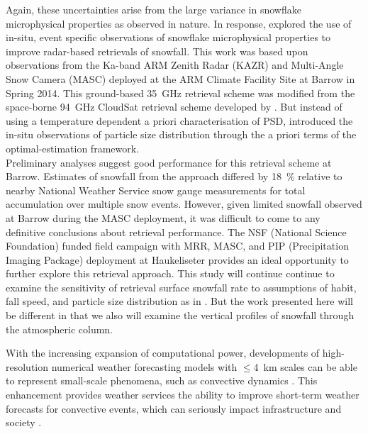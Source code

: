 Again, these uncertainties arise from the large variance in snowflake microphysical  properties as observed in nature. In response, \citet{cooper_variational_2017} explored the use of in-situ, event specific  observations of snowflake microphysical properties to improve radar-based retrievals of snowfall.  This work was based upon observations from the Ka-band ARM Zenith Radar (KAZR) and Multi-Angle Snow Camera (MASC) deployed at the ARM Climate Facility Site at Barrow in Spring 2014. This ground-based \SI{35}{\giga\hertz} retrieval scheme was modified from the space-borne \SI{94}{\giga\hertz} CloudSat retrieval scheme developed by \citet{wood_estimation_2011}. But instead of using a temperature dependent a priori characterisation of PSD, \citeauthor{cooper_variational_2017} introduced the in-situ observations of particle size distribution through the a priori terms of the optimal-estimation framework. 
\\
%
Preliminary analyses suggest good performance for this retrieval scheme at Barrow. Estimates of snowfall from the \citet{cooper_variational_2017} approach differed by \SI{18}{\percent} relative to nearby National Weather Service snow gauge measurements for total accumulation over multiple snow events. However, given limited snowfall observed at Barrow during the MASC deployment, it was difficult to come to any definitive conclusions about retrieval performance. The NSF (National Science Foundation) funded field campaign with MRR, MASC, and PIP (Precipitation Imaging Package) deployment at Haukeliseter provides an ideal opportunity to further explore this retrieval approach. This study will continue continue to examine the sensitivity of retrieval surface snowfall rate to assumptions of habit, fall speed, and particle size distribution as in \citet{cooper_variational_2017}. But the work presented here will be different in that we also will examine the vertical profiles of snowfall through the atmospheric column.  
\par\medskip
\noindent
With the increasing expansion of computational power, developments of high-resolution numerical weather forecasting models with $\le$\SI{4}{\km} scales can be able to represent small-scale phenomena, such as convective dynamics \citep{gowan_validation_2018}. This enhancement provides weather services the ability to improve short-term weather forecasts for convective events, which can seriously impact infrastructure and society \citep{muller_arome-metcoop:_2017}. 
